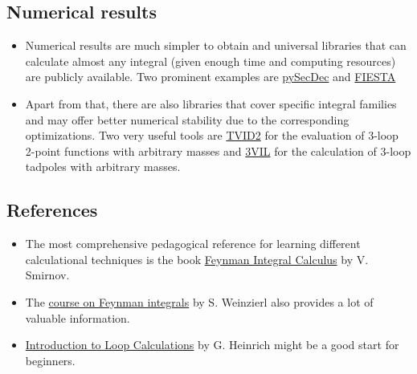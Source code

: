\documentclass[../FeynCalcManual.tex]{subfiles}
\begin{document}
\subsection{Numerical results}\label{numerical-results}

\begin{itemize}
\tightlist
\item
  Numerical results are much simpler to obtain and universal libraries
  that can calculate almost any integral (given enough time and
  computing resources) are publicly available. Two prominent examples
  are \href{https://secdec.readthedocs.io/en/stable/}{pySecDec} and
  \href{https://bitbucket.org/feynmanIntegrals/fiesta/src/master/}{FIESTA}
\item
  Apart from that, there are also libraries that cover specific integral
  families and may offer better numerical stability due to the
  corresponding optimizations. Two very useful tools are
  \href{https://sites.pitt.edu/~afreitas/}{TVID2} for the evaluation of
  3-loop 2-point functions with arbitrary masses and
  \href{https://www.niu.edu/spmartin/3VIL/}{3VIL} for the calculation of
  3-loop tadpoles with arbitrary masses.
\end{itemize}

\subsection{References}\label{references}

\begin{itemize}
\tightlist
\item
  The most comprehensive pedagogical reference for learning different
  calculational techniques is the book
  \href{https://link.springer.com/book/10.1007/3-540-30611-0}{Feynman
  Integral Calculus} by V. Smirnov.
\item
  The \href{https://arxiv.org/pdf/2201.03593}{course on Feynman
  integrals} by S. Weinzierl also provides a lot of valuable
  information.
\item
  \href{https://www.ippp.dur.ac.uk/~gudrun/teaching/ILC.pdf}{Introduction
  to Loop Calculations} by G. Heinrich might be a good start for
  beginners.
\end{itemize}
\end{document}
